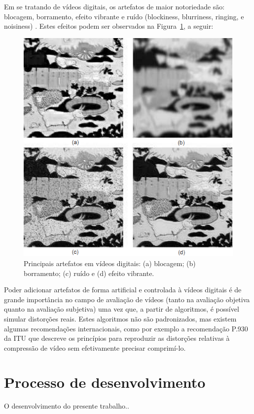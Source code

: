 Em se tratando de vídeos digitais, os artefatos de maior notoriedade são: blocagem, borramento, efeito vibrante e ruído (blockiness, blurriness, ringing, e noisiness) \cite{farias2007}. Estes efeitos podem ser observados na Figura~\ref{fig:artefatosdigitais}, a seguir:

\begin{figure}[!htb]
	\centering
	\includegraphics[scale=0.45]{./imgs/figura1.png}
	\caption{Principais artefatos em vídeos digitais: (a) blocagem; (b) borramento; (c) ruído e (d) efeito vibrante.}
	\label{fig:artefatosdigitais}
\end{figure}


Poder adicionar artefatos de forma artificial e controlada à vídeos digitais é de grande importância no campo de avaliação de vídeos (tanto na avaliação objetiva quanto na avaliação subjetiva) uma vez que, a partir de algoritmos, é possível simular distorções reais. Estes algoritmos não são padronizados, mas existem algumas recomendações internacionais, como por exemplo a recomendação P.930 da ITU \cite{itup930} que descreve os princípios para reproduzir as distorções relativas à compressão de vídeo sem efetivamente precisar comprimí-lo.

\section{Processo de desenvolvimento}
O desenvolvimento do presente trabalho..

